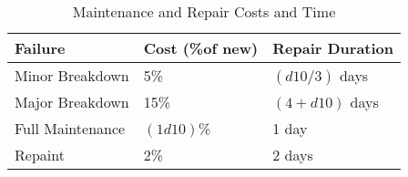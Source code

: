 \documentclass[a4paper,10pt]{article}
\begin{document}

\begin{table}
  \caption{Maintenance and Repair Costs and Time}
  \begin{tabular}{lll}
    \toprule
    Failure          & Cost (\%of new) & Repair Duration  \\
    \midrule
    Minor Breakdown  & 5\%             & $(d10 / 3)$ days\\
    Major Breakdown  & 15\%            & $(4 + d10)$ days \\
    Full Maintenance & $(1d10)$\%      & 1 day\\
    Repaint          & 2\%             & 2 days\\
    \bottomrule
  \end{tabular}
\end{table}
\end{document}
